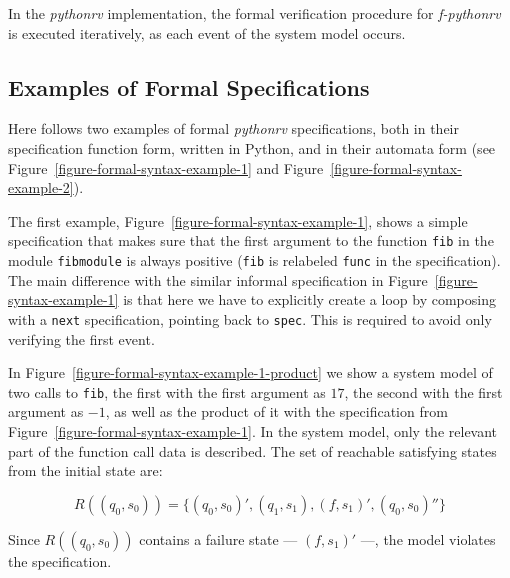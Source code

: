 In the \textit{pythonrv} implementation, the formal verification procedure for
\textit{f-pythonrv} is executed iteratively, as each event of the system model
occurs.





\subsection{Examples of Formal Specifications}
\label{section-approach-examples-of-formal-specifications}
\lstset{language=Python,numbers=none}


Here follows two examples of formal \textit{pythonrv} specifications, both in
their specification function form, written in Python, and in their automata
form (see Figure~\ref{figure-formal-syntax-example-1} and
Figure~\ref{figure-formal-syntax-example-2}).

The first example, Figure~\ref{figure-formal-syntax-example-1}, shows a simple
specification that makes sure that the first argument to the function
\texttt{fib} in the module \texttt{fibmodule} is always positive (\texttt{fib}
is relabeled \texttt{func} in the specification). The main difference with the
similar informal specification in Figure~\ref{figure-syntax-example-1} is that
here we have to explicitly create a loop by composing with a \texttt{next}
specification, pointing back to \texttt{spec}. This is required to avoid only
verifying the first event.

In Figure~\ref{figure-formal-syntax-example-1-product} we show a system model
of two calls to \texttt{fib}, the first with the first argument as $17$, the
second with the first argument as $-1$, as well as the product of it with
the specification from Figure~\ref{figure-formal-syntax-example-1}. In the
system model, only the relevant part of the function call data is described.
The set of reachable satisfying states from the initial state are:

\medskip
\[
  R((q_0,s_0)) = \{(q_0,s_0)', (q_1,s_1), (f,s_1)', (q_0,s_0)''\}
\]
\medskip

Since $R((q_0,s_0))$ contains a failure state --- $(f,s_1)'$ ---, the model
violates the specification.

